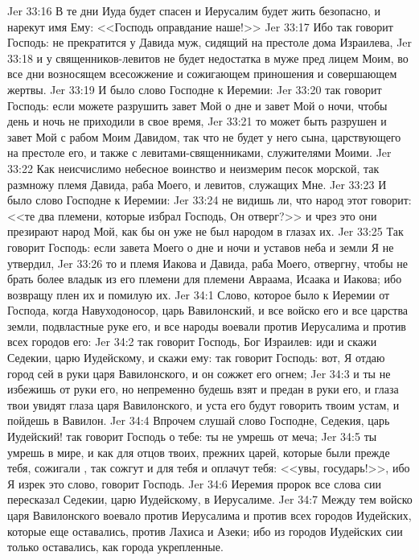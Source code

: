 \vs Jer 33:16 В те дни Иуда будет спасен и Иерусалим будет жить безопасно, и нарекут имя Ему: <<Господь оправдание наше!>>
\vs Jer 33:17 Ибо так говорит Господь: не прекратится у Давида муж, сидящий на престоле дома Израилева,
\vs Jer 33:18 и у священников-левитов не будет недостатка в муже пред лицем Моим, во все дни возносящем всесожжение и сожигающем приношения и совершающем жертвы.
\rsbpar\vs Jer 33:19 И было слово Господне к Иеремии:
\vs Jer 33:20 так говорит Господь: если можете разрушить завет Мой о дне и завет Мой о ночи, чтобы день и ночь не приходили в свое время,
\vs Jer 33:21 то может быть разрушен и завет Мой с рабом Моим Давидом, так что не будет у него сына, царствующего на престоле его, и также с левитами-священниками, служителями Моими.
\vs Jer 33:22 Как неисчислимо небесное воинство и неизмерим песок морской, так размножу племя Давида, раба Моего, и левитов, служащих Мне.
\vs Jer 33:23 И было слово Господне к Иеремии:
\vs Jer 33:24 не видишь ли, что народ этот говорит: <<те два племени, которые избрал Господь, Он отверг?>> и чрез это они презирают народ Мой, как бы он уже не был народом в глазах их.
\vs Jer 33:25 Так говорит Господь: если завета Моего о дне и ночи и уставов неба и земли Я не утвердил,
\vs Jer 33:26 то и племя Иакова и Давида, раба Моего, отвергну, чтобы не брать более владык из его племени для племени Авраама, Исаака и Иакова; ибо возвращу плен их и помилую их.
\vs Jer 34:1 Слово, которое было к Иеремии от Господа, когда Навуходоносор, царь Вавилонский, и все войско его и все царства земли, подвластные руке его, и все народы воевали против Иерусалима и против всех городов его:
\vs Jer 34:2 так говорит Господь, Бог Израилев: иди и скажи Седекии, царю Иудейскому, и скажи ему: так говорит Господь: вот, Я отдаю город сей в руки царя Вавилонского, и он сожжет его огнем;
\vs Jer 34:3 и ты не избежишь от руки его, но непременно будешь взят и предан в руки его, и глаза твои увидят глаза царя Вавилонского, и уста его будут говорить твоим устам, и пойдешь в Вавилон.
\vs Jer 34:4 Впрочем слушай слово Господне, Седекия, царь Иудейский! так говорит Господь о тебе: ты не умрешь от меча;
\vs Jer 34:5 ты умрешь в мире, и как для отцов твоих, прежних царей, которые были прежде тебя, сожигали , так сожгут и для тебя и оплачут тебя: <<увы, государь!>>, ибо Я изрек это слово, говорит Господь.
\vs Jer 34:6 Иеремия пророк все слова сии пересказал Седекии, царю Иудейскому, в Иерусалиме.
\vs Jer 34:7 Между тем войско царя Вавилонского воевало против Иерусалима и против всех городов Иудейских, которые еще оставались, против Лахиса и Азеки; ибо из городов Иудейских сии только оставались, как города укрепленные.
